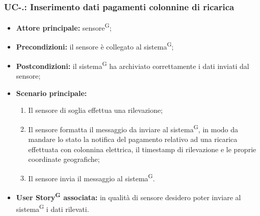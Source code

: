 \documentclass[8pt]{article}
\newcommand{\glossterm}[1]{#1\textsuperscript{G}} %
\begin{document}
\subsubsection*{UC-\theuc .\speconenumber: Inserimento dati pagamenti colonnine di ricarica}
\begin{itemize}
    \item \textbf{Attore principale:} \glossterm{sensore};
    \item \textbf{Precondizioni:} il sensore è collegato al \glossterm{sistema};
    \item \textbf{Postcondizioni:} il \glossterm{sistema} ha archiviato correttamente i dati inviati dal sensore;
    \item \textbf{Scenario principale:}
        \begin{enumerate}
        \item Il sensore di soglia effettua una rilevazione;
        \item Il sensore formatta il messaggio da inviare al \glossterm{sistema}, in modo da mandare lo stato la notifica del pagamento relativo ad una ricarica effettuata con colonnina elettrica, il timestamp di rilevazione e le proprie coordinate geografiche;
        \item Il sensore invia il messaggio al \glossterm{sistema}.
        \end{enumerate}
    \item \textbf{\glossterm{User Story} associata:} in qualità di sensore desidero poter inviare al \glossterm{sistema} i dati rilevati.
\end{itemize}
\end{document}
